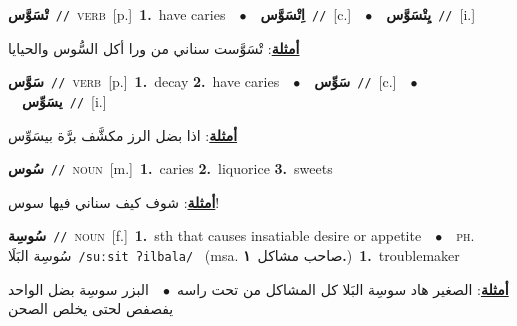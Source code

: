 \documentclass[10pt,a4paper,twoside]{article} %
\begin{document}
\begin{multicols}{2}
{\setlength\topsep{0pt}\textbf{\foreignlanguage{arabic}{تْسَوَّس}}\ {\color{gray}\texttt{//}\color{black}}\ \textsc{verb}\ [p.]\ \textbf{1.}~have caries\ \ $\bullet$\ \ \setlength\topsep{0pt}\textbf{\foreignlanguage{arabic}{اِتْسَوَّس}}\ {\color{gray}\texttt{//}\color{black}}\ [c.]\ \ $\bullet$\ \ \setlength\topsep{0pt}\textbf{\foreignlanguage{arabic}{يِتْسَوَّس}}\ {\color{gray}\texttt{//}\color{black}}\ [i.]\  \begin{flushright}\color{gray}\foreignlanguage{arabic}{\textbf{\underline{\foreignlanguage{arabic}{أمثلة}}}: تْسَوَّست سناني من ورا أكل السُّوس والحيايا}\end{flushright}\color{black}} \vspace{2mm}

{\setlength\topsep{0pt}\textbf{\foreignlanguage{arabic}{سَوَّس}}\ {\color{gray}\texttt{//}\color{black}}\ \textsc{verb}\ [p.]\ \textbf{1.}~decay  \textbf{2.}~have caries\ \ $\bullet$\ \ \setlength\topsep{0pt}\textbf{\foreignlanguage{arabic}{سَوِّس}}\ {\color{gray}\texttt{//}\color{black}}\ [c.]\ \ $\bullet$\ \ \setlength\topsep{0pt}\textbf{\foreignlanguage{arabic}{يسَوِّس}}\ {\color{gray}\texttt{//}\color{black}}\ [i.]\  \begin{flushright}\color{gray}\foreignlanguage{arabic}{\textbf{\underline{\foreignlanguage{arabic}{أمثلة}}}: اذا بضل الرز مكشَّف برَّة بيسَوِّس}\end{flushright}\color{black}} \vspace{2mm}

{\setlength\topsep{0pt}\textbf{\foreignlanguage{arabic}{سُوس}}\ {\color{gray}\texttt{//}\color{black}}\ \textsc{noun}\ [m.]\ \textbf{1.}~caries  \textbf{2.}~liquorice  \textbf{3.}~sweets\  \begin{flushright}\color{gray}\foreignlanguage{arabic}{\textbf{\underline{\foreignlanguage{arabic}{أمثلة}}}: شوف كيف سناني فيها سوس!}\end{flushright}\color{black}} \vspace{2mm}

{\setlength\topsep{0pt}\textbf{\foreignlanguage{arabic}{سُوسِة}}\ {\color{gray}\texttt{//}\color{black}}\ \textsc{noun}\ [f.]\ \textbf{1.}~sth that causes insatiable desire or appetite\ \ $\bullet$\ \ \textsc{ph.} \color{gray} \foreignlanguage{arabic}{سُوسِة البَلَا}\color{black}\ {\color{gray}\texttt{/{\sffamily suːsit ʔilbala}/}\color{black}}\ \color{gray} (msa. \foreignlanguage{arabic}{صاحب مشاكل}~\foreignlanguage{arabic}{\textbf{١.}})\color{black}\ \textbf{1.}~troublemaker\  \begin{flushright}\color{gray}\foreignlanguage{arabic}{\textbf{\underline{\foreignlanguage{arabic}{أمثلة}}}: الصغير هاد سوسِة البَلا كل المشاكل من تحت راسه\ $\bullet$\ \  البزر سوسِة بضل الواحد يفصفص لحتى يخلص الصحن}\end{flushright}\color{black}} \vspace{2mm}


\end{multicols}
\end{document}
